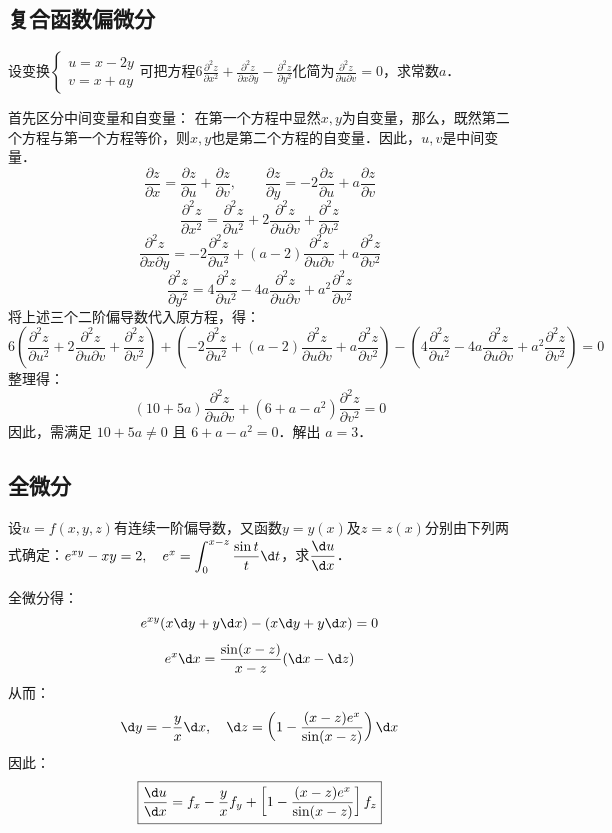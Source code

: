 \documentclass[12pt, a4paper, oneside, UTF8]{ctexbook}
\begin{document}
\subsection{复合函数偏微分}
\begin{exercise}
    设变换$\begin{cases}
        u = x-2y\\
        v = x+ay
    \end{cases}$可把方程$\displaystyle{6\frac{\partial^2z}{\partial x^2}+\frac{\partial^2z}{\partial x \partial y}-\frac{\partial^2z}{\partial y^2}}$化简为$\displaystyle\frac{\partial^2 z}{\partial u \partial v} = 0$，求常数$a$．
\end{exercise}
\begin{solution}
    首先区分中间变量和自变量：
    在第一个方程中显然$x,y$为自变量，那么，既然第二个方程与第一个方程等价，则$x,y$也是第二个方程的自变量．因此，$u,v$是中间变量．
    \[\frac{\partial z}{\partial x}=\frac{\partial z}{\partial u}+\frac{\partial z}{\partial v},\qquad\frac{\partial z}{\partial y}=-2\frac{\partial z}{\partial u}+a\frac{\partial z}{\partial v}\]
    \[\frac{\partial^2z}{\partial x^2}=\frac{\partial^2 z}{\partial u^2}+2\frac{\partial^2 z}{\partial u \partial v}+\frac{\partial^2 z}{\partial v^2}\]
    \[\frac{\partial^2 z}{\partial x \partial y}=-2\frac{\partial^2 z}{\partial u^2}+(a-2)\frac{\partial^2 z}{\partial u \partial v}+a\frac{\partial^2 z}{\partial v^2}\]
    \[\frac{\partial^2 z}{\partial y^2}=4\frac{\partial^2 z}{\partial u^2}-4a\frac{\partial^2 z}{\partial u \partial v}+a^2\frac{\partial^2 z}{\partial v^2}\]
    将上述三个二阶偏导数代入原方程，得：
    \[6\left(\frac{\partial^2 z}{\partial u^2}+2\frac{\partial^2 z}{\partial u \partial v}+\frac{\partial^2 z}{\partial v^2}\right) + \left(-2\frac{\partial^2 z}{\partial u^2}+(a-2)\frac{\partial^2 z}{\partial u \partial v}+a\frac{\partial^2 z}{\partial v^2}\right) - \left(4\frac{\partial^2 z}{\partial u^2}-4a\frac{\partial^2 z}{\partial u \partial v}+a^2\frac{\partial^2 z}{\partial v^2}\right) = 0 \]
    整理得：
    \[ (10+5a)\frac{\partial^2z}{\partial u \partial v}+(6+a-a^2)\frac{\partial^2 z}{\partial v^2} = 0 \]
    因此，需满足 $10 + 5a \neq 0$ 且 $6 + a - a^2 = 0$．解出 $\boxed{a = 3}$．
\end{solution}
\subsection{全微分}
\begin{exercise}
    设$u=f(x,y,z)$有连续一阶偏导数，又函数$y=y(x)$及$z=z(x)$分别由下列两式确定：$e^{xy}-xy=2,\quad e^x=\displaystyle\int_{0}^{x-z}\frac{\sin t}{t}\d t$，求$\dfrac{\d u}{\d x}$．
\end{exercise}
\begin{solution}
    全微分得：
    \[ e^{xy}(x\d y + y \d x) - (x \d y + y \d x) = 0 \]
    \[ e^x \d x = \frac{\sin(x-z)}{x-z} (\d x - \d z) \]
    从而：
    \[ \d y = -\frac{y}{x} \d x, \quad \d z = \left( 1 - \frac{(x-z)e^x}{\sin(x-z)} \right) \d x \]
    因此：
    \[ \boxed{\frac{\d u}{\d x} = f_x - \frac{y}{x} f_y + \left[ 1 - \frac{(x-z)e^x}{\sin(x-z)} \right] f_z} \]
\end{solution}
\end{document}
